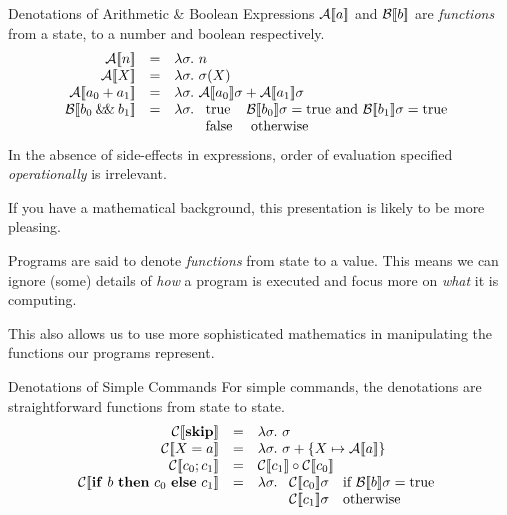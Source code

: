 \begin{frame}{Denotations of Arithmetic \& Boolean Expressions}
    $\mathcal{A} [\![ a ]\!]$ and $\mathcal{B} [\![ b ]\!]$ are \emph{functions} from a state, to a number and
    boolean respectively.
    \pause
    \[\begin{array}{rcl}
        \denA{n} & = & \lambda \sigma.\ n \\
        \denA{X} & = & \lambda \sigma.\ \sigma(X) \\
        \denA{a_0 + a_1} & = & \lambda \sigma.\ \denA{a_0}\sigma + \denA{a_1}\sigma \\
        \denB{b_0 \doubleAmp b_1} & = &
            \lambda \sigma.\ \begin{array}[t]{ll}
                \mathrm{true} & \denB{b_0}\sigma = \mathrm{true} \text{ and } \denB{b_1}\sigma = \mathrm{true} \\
                \mathrm{false} & \text{ otherwise}
            \end{array}
    \end{array}\]
    \pause
    \alert{In the absence of side-effects in expressions, order of evaluation specified \emph{operationally} is irrelevant.}
\end{frame}

If you have a mathematical background, this presentation is likely to be more
pleasing.

Programs are said to denote \emph{functions} from state to a value. This
means we can ignore (some) details of \emph{how} a program is executed and
focus more on \emph{what} it is computing.

This also allows us to use more sophisticated mathematics in manipulating the
functions our programs represent.

\begin{frame}{Denotations of Simple Commands}
    For simple commands, the denotations are straightforward functions from
    state to state.
    \[\begin{array}{rcl}
        \denC{\mathbf{skip}} & = & \lambda \sigma.\ \sigma \\
        \denC{X = a} & = & \lambda \sigma.\ \sigma + \{ X \mapsto \denA{a}\} \\
        \denC{c_0; c_1} & = & \denC{c_1} \circ \denC{c_0} \\
        \denC{\mathbf{if}\ b\ \mathbf{then}\ c_0\ \mathbf{else}\ c_1} & = &
            \lambda \sigma.\ \begin{array}[t]{ll}
                \denC{c_0}\sigma & \text{if } \denB{b}\sigma = \mathrm{true} \\
                \denC{c_1}\sigma & \text{otherwise}
            \end{array}
    \end{array}\]
\end{frame}

